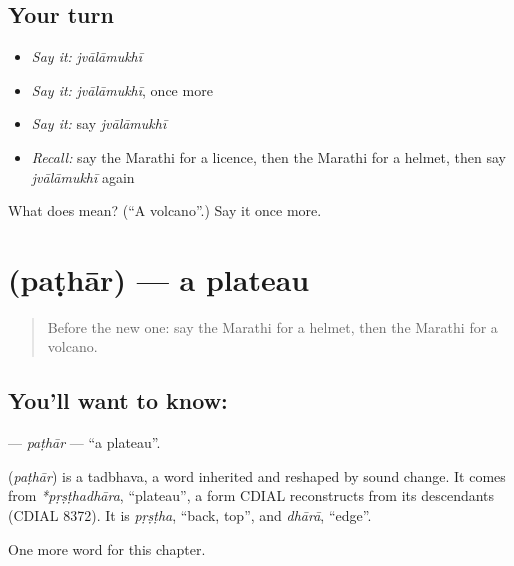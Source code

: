 \subsection*{Your turn}
\begin{itemize}
\raggedright
  \item \emph{Say it:} \emph{jvālāmukhī}
  \item \emph{Say it:} \emph{jvālāmukhī}, once more
  \item \emph{Say it:} say \emph{jvālāmukhī}
  \item \emph{Recall:} say the Marathi for a licence, then the Marathi for a helmet, then say \emph{jvālāmukhī} again
\end{itemize}

\begin{tcolorbox}[breakable,colback=teal!4,colframe=teal!35!black,title={Before you move on}]
What does  mean? (\textquotedblleft{}A volcano\textquotedblright{}.) Say it once more.
\end{tcolorbox}
\section[\texorpdfstring{\mr{पठार} (paṭhār)}{पठार (paṭhār)}]{ (paṭhār) — a plateau}

\label{lesson:MR-C267-pathar}



\begin{quote}
Before the new one: say the Marathi for a helmet, then the Marathi for a volcano.
\end{quote}

\subsection*{You'll want to know: }
\textbf{} — \emph{paṭhār} — \textquotedblleft{}a plateau\textquotedblright{}.

\begin{cousinweb}
\textbf{} (\emph{paṭhār}) is a tadbhava, a word inherited and reshaped by sound change. It comes from \emph{*pṛṣṭhadhāra}, \textquotedblleft{}plateau\textquotedblright{}, a form CDIAL reconstructs from its descendants (CDIAL 8372). It is \emph{pṛṣṭha}, \textquotedblleft{}back, top\textquotedblright{}, and \emph{dhārā}, \textquotedblleft{}edge\textquotedblright{}.
\end{cousinweb}

\begin{grammarlens}[title={What you've built}]
One more word for this chapter.
\end{grammarlens}

